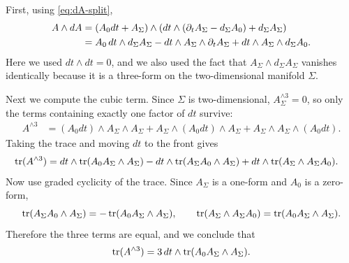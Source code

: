 \medskip

\noindent First, using \eqref{eq:dA-split},
\begin{align}
A\wedge dA
&=
(A_0dt + A_\Sigma)\wedge\left(dt\wedge(\partial_t A_\Sigma - d_\Sigma A_0) + d_\Sigma A_\Sigma\right) \notag\\
&=
A_0\,dt\wedge d_\Sigma A_\Sigma
- dt\wedge A_\Sigma\wedge \partial_t A_\Sigma
+ dt\wedge A_\Sigma\wedge d_\Sigma A_0.
\label{eq:A-dA-split}
\end{align}
Here we used $dt\wedge dt = 0$, and we also used the fact that $A_\Sigma\wedge d_\Sigma A_\Sigma$ vanishes identically because it is a three-form on the two-dimensional manifold $\Sigma$.

\medskip

\noindent Next we compute the cubic term. Since $\Sigma$ is two-dimensional, $A_\Sigma^{\wedge 3}=0$, so only the terms containing exactly one factor of $dt$ survive:
\begin{align*}
A^{\wedge 3}
&=
(A_0dt)\wedge A_\Sigma\wedge A_\Sigma
+ A_\Sigma\wedge (A_0dt)\wedge A_\Sigma
+ A_\Sigma\wedge A_\Sigma\wedge (A_0dt).
\end{align*}
Taking the trace and moving $dt$ to the front gives
\begin{align*}
\operatorname{tr}(A^{\wedge 3})
&=
dt\wedge \operatorname{tr}(A_0A_\Sigma\wedge A_\Sigma)
- dt\wedge \operatorname{tr}(A_\Sigma A_0\wedge A_\Sigma)
+ dt\wedge \operatorname{tr}(A_\Sigma\wedge A_\Sigma A_0).
\end{align*}
Now use graded cyclicity of the trace. Since $A_\Sigma$ is a one-form and $A_0$ is a zero-form,
\begin{equation*}
\operatorname{tr}(A_\Sigma A_0\wedge A_\Sigma) = -\operatorname{tr}(A_0A_\Sigma\wedge A_\Sigma),
\qquad
\operatorname{tr}(A_\Sigma\wedge A_\Sigma A_0) = \operatorname{tr}(A_0A_\Sigma\wedge A_\Sigma).
\end{equation*}
Therefore the three terms are equal, and we conclude that
\begin{equation}\label{eq:A-cubed-split}
\operatorname{tr}(A^{\wedge 3}) = 3\,dt\wedge \operatorname{tr}(A_0A_\Sigma\wedge A_\Sigma).
\end{equation}

\medskip


